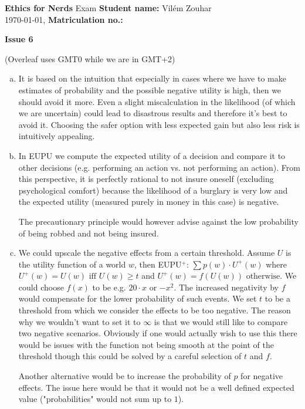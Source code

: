 \documentclass[a4paper, 11pt]{article}
\newcommand{\stdn}{} \newcommand{\studentname}[1]{\renewcommand{\stdn}{#1}}
\newcommand{\mtrk}{} \newcommand{\matriculationno}[1]{\renewcommand{\mtrk}{#1}}
\newcommand{\isnr}{} \newcommand{\issuenumber}[1]{\renewcommand{\isnr}{#1}}
\newcommand{\makeheader}{\textbf{Ethics for Nerds} Exam \hfill \textbf{Student name:} \stdn \\ \today, \currenttime \hfill \textbf{Matriculation no.:} \mtrk \par \textbf{\Large Issue \isnr}}
\begin{document}
\sffamily


\studentname{Vilém Zouhar} %
\matriculationno{} %
\issuenumber{6} %
\makeheader %


(Overleaf uses GMT0 while we are in GMT+2)

\begin{enumerate}[a)]
    \item
    It is based on the intuition that especially in cases where we have to make estimates of probability and the possible negative utility is high, then we should avoid it more.
    Even a slight miscalculation in the likelihood (of which we are uncertain) could lead to disastrous results and therefore it's best to avoid it.
    Choosing the safer option with less expected gain but also less risk is intuitively appealing.
    
    \item
    In EUPU we compute the expected utility of a decision and compare it to other decisions (e.g. performing an action vs. not performing an action).
    From this perspective, it is perfectly rational to not insure oneself (excluding psychological comfort) because the likelihood of a burglary is very low and the expected utility (measured purely in money in this case) is negative.
    
    The precautionary principle would however advise against the low probability of being robbed and not being insured.
    
    \item
    We could upscale the negative effects from a certain threshold.
    Assume $U$ is the utility function of a world $w$, then EUPU$^+$: $\sum p(w) \cdot U^+(w)$ where $U^+(w) = U(w) \text{ iff } U(w) \ge t$ and $U^+(w) = f(U(w)) \text{ otherwise}$.
    We could choose $f(x)$ to be e.g. $20\cdot x$ or $-x^2$.
    The increased negativity by $f$ would compensate for the lower probability of such events.
    We set $t$ to be a threshold from which we consider the effects to be too negative.
    The reason why we wouldn't want to set it to $\infty$ is that we would still like to compare two negative scenarios.
    Obviously if one would actually wish to use this there would be issues with the function not being smooth at the point of the threshold though this could be solved by a careful selection of $t$ and $f$.
    
    Another alternative would be to increase the probability of $p$ for negative effects.
    The issue here would be that it would not be a well defined expected value ("probabilities" would not sum up to $1$).
\end{enumerate}

\end{document}
